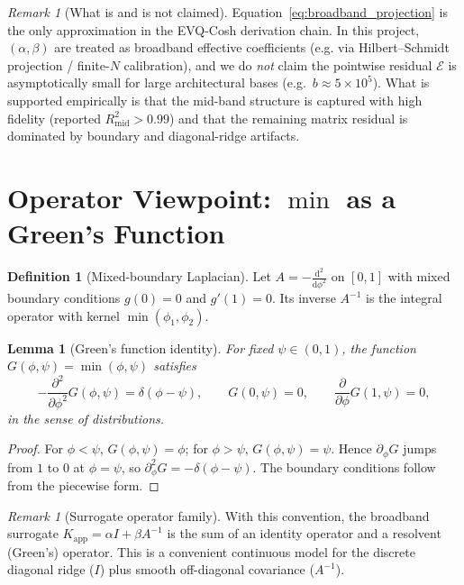 \documentclass[11pt]{article}
\theoremstyle{plain}
\newtheorem{lemma}[theorem]{Lemma}
\theoremstyle{definition}
\newtheorem{definition}[theorem]{Definition}
\theoremstyle{remark}
\newtheorem{remark}[theorem]{Remark}
\newcommand{\E}{\mathcal{E}}
\begin{document}
\begin{remark}[What is and is not claimed]
Equation~\eqref{eq:broadband_projection} is the only approximation in the EVQ-Cosh
derivation chain. In this project, $(\alpha,\beta)$ are treated as broadband
effective coefficients (e.g. via Hilbert--Schmidt projection / finite-$N$
calibration), and we do \emph{not} claim the pointwise residual $\E$ is
asymptotically small for large architectural bases (e.g.\ $b\approx 5\times10^5$).
What is supported empirically is that the mid-band structure is captured with
high fidelity (reported $R^2_{\mathrm{mid}}>0.99$) and that the remaining matrix
residual is dominated by boundary and diagonal-ridge artifacts.
\end{remark}

\section{Operator Viewpoint: \texorpdfstring{$\min$}{min} as a Green's Function}

\begin{definition}[Mixed-boundary Laplacian]
Let $A=-\frac{\mathrm{d}^2}{\mathrm{d}\phi^2}$ on $[0,1]$ with mixed boundary
conditions $g(0)=0$ and $g'(1)=0$. Its inverse $A^{-1}$ is the integral operator
with kernel $\min(\phi_1,\phi_2)$.
\end{definition}

\begin{lemma}[Green's function identity]
For fixed $\psi\in(0,1)$, the function $G(\phi,\psi)=\min(\phi,\psi)$ satisfies
\begin{equation}
-\frac{\partial^2}{\partial \phi^2}G(\phi,\psi)=\delta(\phi-\psi),\qquad
G(0,\psi)=0,\qquad
\frac{\partial}{\partial\phi}G(1,\psi)=0,
\end{equation}
in the sense of distributions.
\end{lemma}
\begin{proof}
For $\phi<\psi$, $G(\phi,\psi)=\phi$; for $\phi>\psi$, $G(\phi,\psi)=\psi$.
Hence $\partial_\phi G$ jumps from $1$ to $0$ at $\phi=\psi$, so
$\partial_\phi^2 G=-\delta(\phi-\psi)$. The boundary conditions follow from the
piecewise form.
\end{proof}

\begin{remark}[Surrogate operator family]
With this convention, the broadband surrogate
$K_{\mathrm{app}}=\alpha I+\beta A^{-1}$ is the sum of an identity operator and a
resolvent (Green's) operator. This is a convenient continuous model for the
discrete diagonal ridge ($I$) plus smooth off-diagonal covariance ($A^{-1}$).
\end{remark}
\end{document}
